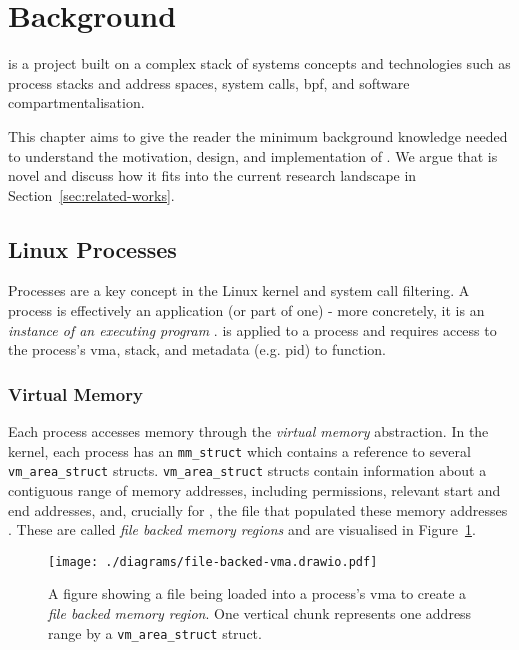 
\section{Background}\label{sec:background}

\af is a project built on a complex stack of systems concepts and technologies
such as process stacks and address spaces, system calls, \ac{bpf}, and software
compartmentalisation. 

This chapter aims to give the reader the minimum background knowledge needed
to understand the motivation, design, and implementation of \af. We argue that
\af is novel and discuss how it  fits into the current research landscape in
Section~\ref{sec:related-works}.

\subsection{Linux Processes}

Processes are a key concept in the Linux kernel and system call
filtering. A process is effectively an application (or part of one) - more 
concretely, it is an \textit{instance of an executing program} 
\cite{LINUX_PROGRAMMING_INTERFACE}. \af is applied to a process and requires 
access to the process's \ac{vma}, stack, and metadata (e.g. \ac{pid}) to 
function.

\subsubsection{Virtual Memory}

Each process accesses memory through the \textit{virtual memory} abstraction.
In the kernel, each process has an \texttt{mm\_struct} which contains a
reference to several \texttt{vm\_area\_struct} structs. 
\texttt{vm\_area\_struct} structs contain information about a contiguous
range of memory addresses, including permissions, relevant start and end
addresses, and, crucially for \af, the file that populated these
memory addresses \cite{love2005linux}. These are called \textit{file backed
memory regions} and are visualised in Figure~\ref{fig:file-backed-vma}.

\begin{figure}[ht]
    \centering
    \texttt{[image: ./diagrams/file-backed-vma.drawio.pdf]} 
    \caption{A figure showing a file being loaded into a process's \ac{vma} to
    create a \textit{file backed memory region}. One vertical chunk represents
one address range by a \texttt{vm\_area\_struct} struct.}
    \label{fig:file-backed-vma}
\end{figure}

